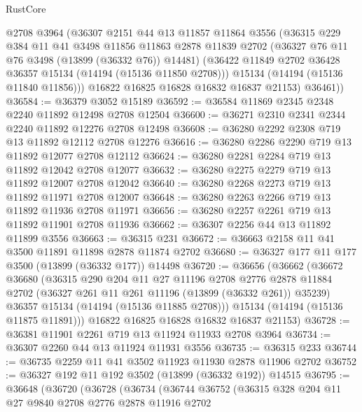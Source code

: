 \begin{lexlean}{RustCore}
\begin{coremodule}
        @2708
        @3964
        (@36307
          @2151
          @44
          @13
          @11857
          @11864
          @3556
          (@36315
            @229
            @384
            @11
            @41
            @3498
            @11856
            @11863
            @2878
            @11839
            @2702
            (@36327 @76 @11 @76 @3498 (@13899 (@36332 @76)) @14481)
            (@36422 @11849 @2702 @36428 @36357 @15134 (@14194 (@15136 @11850 @2708)))
            @15134
            (@14194 (@15136 @11840 @11856)))
          @16822
          @16825
          @16828
          @16832
          @16837
          @21153)
        @36461))
@36584 := @36379 @3052 @15189
@36592 := @36584 @11869 @2345 @2348 @2240 @11892 @12498 @2708 @12504
@36600 := @36271 @2310 @2341 @2344 @2240 @11892 @12276 @2708 @12498
@36608 := @36280 @2292 @2308 @719 @13 @11892 @12112 @2708 @12276
@36616 := @36280 @2286 @2290 @719 @13 @11892 @12077 @2708 @12112
@36624 := @36280 @2281 @2284 @719 @13 @11892 @12042 @2708 @12077
@36632 := @36280 @2275 @2279 @719 @13 @11892 @12007 @2708 @12042
@36640 := @36280 @2268 @2273 @719 @13 @11892 @11971 @2708 @12007
@36648 := @36280 @2263 @2266 @719 @13 @11892 @11936 @2708 @11971
@36656 := @36280 @2257 @2261 @719 @13 @11892 @11901 @2708 @11936
@36662 := @36307 @2256 @44 @13 @11892 @11899 @3556
@36663 := @36315 @231
@36672 := @36663 @2158 @11 @41 @3500 @11891 @11898 @2878 @11874 @2702
@36680 := @36327 @177 @11 @177 @3500 (@13899 (@36332 @177)) @14498
@36720 := @36656
    (@36662
      (@36672
        @36680
        (@36315
          @290
          @204
          @11
          @27
          @11196
          @2708
          @2776
          @2878
          @11884
          @2702
          (@36327 @261 @11 @261 @11196 (@13899 (@36332 @261)) @35239)
          @36357
          @15134
          (@14194 (@15136 @11885 @2708)))
        @15134
        (@14194 (@15136 @11875 @11891)))
      @16822
      @16825
      @16828
      @16832
      @16837
      @21153)
@36728 := @36381 @11901 @2261 @719 @13 @11924 @11933 @2708 @3964
@36734 := @36307 @2260 @44 @13 @11924 @11931 @3556
@36735 := @36315 @233
@36744 := @36735 @2259 @11 @41 @3502 @11923 @11930 @2878 @11906 @2702
@36752 := @36327 @192 @11 @192 @3502 (@13899 (@36332 @192)) @14515
@36795 := @36648
    (@36720
      (@36728
        (@36734
          (@36744
            @36752
            (@36315
              @328
              @204
              @11
              @27
              @9840
              @2708
              @2776
              @2878
              @11916
              @2702

\end{coremodule}
\end{lexlean}
